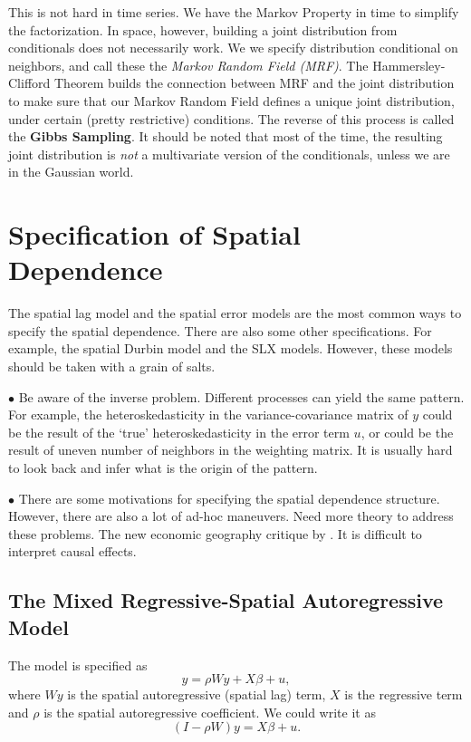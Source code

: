 \documentclass[11pt,a4paper]{amsart}
\theoremstyle{plain}
\theoremstyle{definition}
\begin{document}
This is not hard in time series. We have the Markov Property in time to simplify the factorization. In space, however, building a joint distribution from conditionals  does not necessarily work. We we specify distribution conditional on neighbors, and call these the \textit{Markov Random Field (MRF)}. The Hammersley-Clifford Theorem builds the connection between MRF and the joint distribution to make sure that our Markov Random Field defines a unique joint distribution, under certain (pretty restrictive) conditions. The reverse of this process is called the \textbf{Gibbs Sampling}. It should be noted that most of the time, the resulting joint distribution is \textit{not} a multivariate version of the conditionals, unless we are in the Gaussian world. 

\section{Specification of Spatial Dependence}
The spatial lag model and the spatial error models are the most common ways to specify the spatial dependence. There are also some other specifications. For example, the spatial Durbin model and the SLX models. However, these models should be taken with a grain of salts. 

$\bullet$ Be aware of the inverse problem. Different processes can yield the same pattern. For example, the heteroskedasticity in the variance-covariance matrix of $y$ could be the result of the `true' heteroskedasticity  in the error term $u$, or could be the result of uneven number of neighbors in the weighting matrix. It is usually hard to look back and infer what is the origin of the pattern. 

$\bullet$ There are some motivations for specifying the spatial dependence structure. However, there are also a lot of ad-hoc maneuvers. Need more theory to address these problems. The new economic geography critique by \textcite{gibbonsMostlyPointlessSpatial2012}. It is difficult to interpret causal effects.

\subsection{The Mixed Regressive-Spatial Autoregressive Model}\hfill\par 
The model is specified as 
\[	y = \rho Wy + X \beta + u, 	\]
where $Wy$ is the spatial autoregressive (spatial lag) term, $X$ is the regressive term and $\rho$ is the spatial autoregressive coefficient. We could write it as 
\[	(I-\rho W) y = X \beta + u.	\]
\end{document}
